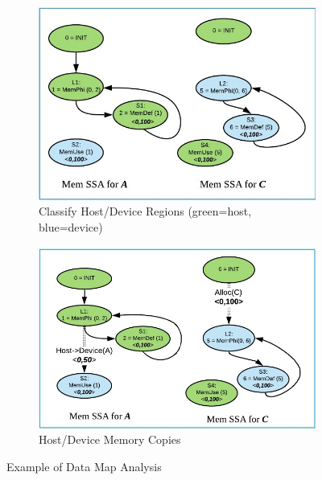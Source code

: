 \begin{figure}[h!]
    ~ %
    \begin{subfigure}[b]{0.46\textwidth}
        \includegraphics[width=\textwidth]{images/memorySSA-example1-s2.jpg}
        \caption{Classify Host/Device Regions (green=host, blue=device)}
        \label{fig:memorySSA-example1-s2}
    \end{subfigure}
    \begin{subfigure}[b]{0.51\textwidth}
        \includegraphics[width=\textwidth]{images/memorySSA-example1-s3.jpg}
        \caption{Host/Device Memory Copies}
        \label{fig:memorySSA-example1-s3}
    \end{subfigure}
    \caption{Example of Data Map Analysis } 
    \label{fig:memorySSA-example1}
\end{figure}
\vspace{-13pt}
